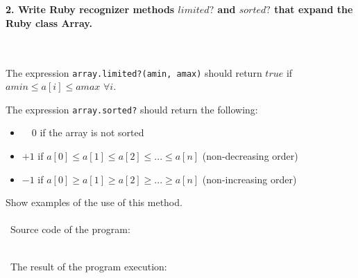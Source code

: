 \documentclass{article}
\begin{document}
\paragraph{}\




\paragraph{}\
\paragraph{}\


	\paragraph{2. Write Ruby recognizer methods \(limited?\) and \(sorted?\) that expand the Ruby class Array.}\ \newline
	
	The expression \texttt{array.limited?(amin, amax)} should return \(true\) if  \(amin  \leqslant  a[i]  \leqslant  amax\) \(\forall i\). \newline
	
	The expression \texttt{array.sorted?} should return the following: 
	\begin{itemize}
		\item \ \ \(0\) \quad  if the array is not sorted
		\item \(+1\) \quad if \(a[0] \leqslant a[1] \leqslant a[2] \leqslant ... \leqslant a[n]\) (non-decreasing order)
		\item \(-1\) \quad if \(a[0] \geqslant a[1] \geqslant a[2] \geqslant ... \geqslant a[n]\) (non-increasing order)
	\end{itemize}
	
	Show examples of the use of this method.

\paragraph{}\	
Source code of the program:

\begin{verbatim} 

\end{verbatim}	

\paragraph{}\
	The result of the program execution:
	
\end{document}
